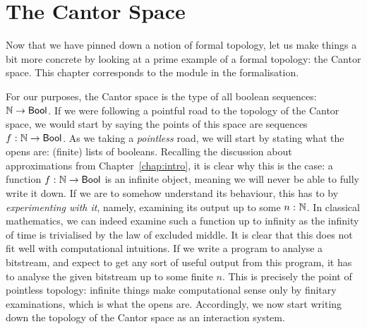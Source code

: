 \chapter{The Cantor Space}\label{chap:cantor}

Now that we have pinned down a notion of formal topology, let us make things a bit more
concrete by looking at a prime example of a formal topology: the Cantor space. This
chapter corresponds to the  module in the \veragda{} formalisation.

For our purposes, the Cantor space is the type of all boolean sequences: $\mathbb{N}{} \rightarrow
\mathsf{Bool}{}$. If we were following a pointful road to the topology of the Cantor space, we
would start by saying the points of this space are sequences
$f\hspace{0.1mm}:\hspace{0.1mm}\mathbb{N}{} \rightarrow \mathsf{Bool}{}$. As we taking a \emph{pointless} road, we will start by
stating what the opens are: (finite) lists of booleans. Recalling the discussion about
approximations from Chapter~\ref{chap:intro}, it is clear why this is the case: a
function $f\hspace{0.1mm}:\hspace{0.1mm}\mathbb{N}{} \rightarrow \mathsf{Bool}{}$ is an infinite object, meaning we will never be
able to fully write it down. If we are to somehow understand its behaviour, this has to
by \emph{experimenting with it}, namely, examining its output up to some
$n\hspace{0.1mm}:\hspace{0.1mm}\mathbb{N}{}$. In classical mathematics, we can indeed examine such a function
up to infinity as the infinity of time is trivialised by the law of excluded middle.
It is clear that this does not fit well with computational intuitions. If we write a
program to analyse a bitstream, and expect to get any sort of useful output from this
program, it has to analyse the given bitstream up to some finite $n$. This is precisely
the point of pointless topology: infinite things make computational sense only by finitary
examinations, which is what the opens are. Accordingly, we now start writing down the
topology of the Cantor space as an interaction system.

